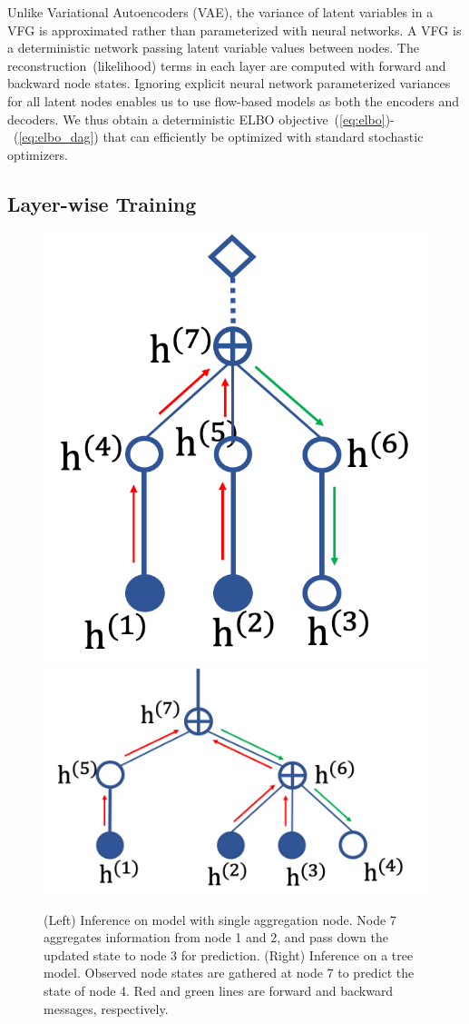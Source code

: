 \documentclass[twoside]{article}
\begin{document}
Unlike Variational Autoencoders (VAE), the variance of latent variables in a VFG is approximated rather than parameterized with neural networks. 
A VFG is a deterministic network passing latent variable values between nodes. 
The reconstruction~(likelihood) terms in each layer are computed with forward and backward node states. 
Ignoring explicit neural network parameterized variances for all latent nodes enables us to use flow-based models as both the encoders and decoders. 
We thus obtain a deterministic ELBO objective~(\ref{eq:elbo})-~(\ref{eq:elbo_dag}) that can efficiently be optimized with standard stochastic optimizers. 

\subsection{Layer-wise Training}
\begin{figure}
\begin{center}
 \includegraphics[width=0.32\linewidth]{fig/two_layer_infer.png}
 \includegraphics[width=0.62\linewidth]{fig/tree_infer.png}
\end{center}
\vspace{-0.1in}
 \caption{{\small (Left) Inference on model with single aggregation node. Node 7 aggregates information from node 1 and 2, and  pass down the updated state to node 3 for prediction. (Right) Inference on a tree model. Observed node states are gathered at node 7 to predict the state of node 4. Red and green lines are forward and backward messages, respectively.}}
\label{fig:two_layer_infer}
\vspace{-0.1in}
\end{figure}
\end{document}
